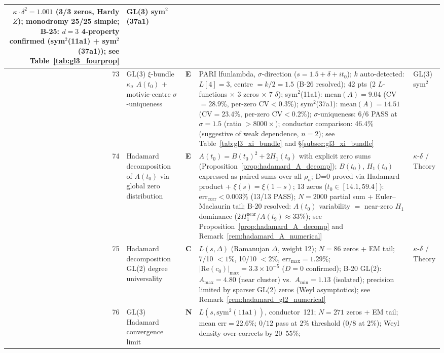 \documentclass[11pt, a4paper]{article}
\theoremstyle{definition}
\theoremstyle{plain}
\begin{document}
\begin{center}
\begin{longtable}{@{}r l l p{4.2cm} l@{}}
   $\kappa{\cdot}\delta^2{=}1.001$ (3/3 zeros, Hardy $Z$);
   monodromy 25/25 simple;
   B-25: $d{=}3$ 4-property confirmed (sym$^2$(11a1) + sym$^2$(37a1));
   see Table~\ref{tab:gl3_fourprop}
   & GL(3) sym$^2$(37a1) \\
\midrule
73 & GL(3) $\xi$-bundle $\kappa_\sigma$ $A(t_0)$ $+$ motivic-centre $\sigma$-uniqueness & \textbf{E} &
   PARI lfunlambda, $\sigma$-direction ($s{=}1.5{+}\delta{+}it_0$);
   $k$ auto-detected: $L[4]{=}3$, centre ${=}k/2{=}1.5$ (B-26 resolved);
   42 pts (2 $L$-functions ${\times}$ 3 zeros ${\times}$ 7 $\delta$);
   sym$^2$(11a1): mean$(A){=}9.04$ (CV${=}28.9\%$, per-zero CV${<}0.3\%$);
   sym$^2$(37a1): mean$(A){=}14.51$ (CV${=}23.4\%$, per-zero CV${<}0.2\%$);
   $\sigma$-uniqueness: 6/6 PASS at $\sigma{=}1.5$ (ratio ${>}8000\times$);
   conductor comparison: 46.4\% (suggestive of weak dependence, $n{=}2$);
   see Table~\ref{tab:gl3_xi_bundle} and \S\ref{subsec:gl3_xi_bundle}
   & GL(3) sym$^2$ \\
\midrule
74 & Hadamard decomposition of $A(t_0)$ via global zero distribution & \textbf{E} &
   $A(t_0) = B(t_0)^2 + 2H_1(t_0)$ with explicit zero sums
   (Proposition~\ref{prop:hadamard_A_decomp});
   $B(t_0)$, $H_1(t_0)$ expressed as paired sums over all $\rho_n$;
   D=0 proved via Hadamard product + $\xi(s){=}\xi(1-s)$;
   13 zeros ($t_0{\in}[14.1,59.4]$): $\mathrm{err}_{\mathrm{corr}}{<}0.003\%$ (13/13 PASS);
   $N{=}2000$ partial sum + Euler--Maclaurin tail;
   B-20 resolved: $A(t_0)$ variability $=$ near-zero $H_1$ dominance
   ($2H_1^{\mathrm{near}}/A(t_9) {\approx} 33\%$);
   see Proposition~\ref{prop:hadamard_A_decomp} and Remark~\ref{rem:hadamard_A_numerical}
   & $\kappa$-$\delta$ / Theory \\
\midrule
75 & Hadamard decomposition GL(2) degree universality & \textbf{C} &
   $L(s,\Delta)$ (Ramanujan $\Delta$, weight 12); $N{=}86$ zeros + EM tail;
   7/10 ${<}1\%$, 10/10 ${<}2\%$, $\mathrm{err}_{\mathrm{max}}{=}1.29\%$;
   $|\mathrm{Re}(c_0)|_{\mathrm{max}}{=}3.3{\times}10^{-5}$ ($D{=}0$ confirmed);
   B-20 GL(2): $A_{\mathrm{max}}{=}4.80$ (near cluster) vs.\ $A_{\mathrm{min}}{=}1.13$ (isolated);
   precision limited by sparser GL(2) zeros (Weyl asymptotics);
   see Remark~\ref{rem:hadamard_gl2_numerical}
   & $\kappa$-$\delta$ / Theory \\
\midrule
76 & GL(3) Hadamard convergence limit & \textbf{N} &
   $L(s,\mathrm{sym}^2(11\mathrm{a}1))$, conductor~121; $N{=}271$ zeros + EM tail;
   mean $\mathrm{err}{=}22.6\%$; $0/12$ pass at $2\%$ threshold ($0/8$ at $2\%$);
   Weyl density over-corrects by 20--55\%;

\end{longtable}
\end{center}
\end{document}
